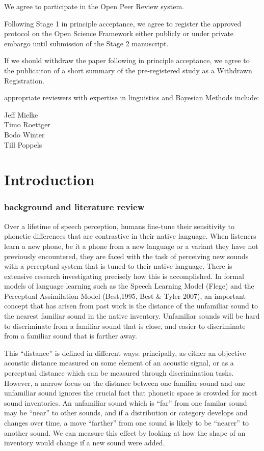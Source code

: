 \documentclass[]{article}
\begin{document}
We agree to participate in the Open Peer Review system.

Following Stage 1 in principle acceptance, we agree to register the
approved protocol on the Open Science Framework either publicly or under
private embargo until submission of the Stage 2 manuscript.

If we should withdraw the paper following in principle acceptance, we
agree to the publicaiton of a short summary of the pre-registered study
as a Withdrawn Registration.

appropriate reviewers with expertise in linguistics and Bayesian Methods
include:

Jeff Mielke\\
Timo Roettger\\
Bodo Winter\\
Till Poppels

\hypertarget{introduction}{%
\section{Introduction}\label{introduction}}

\hypertarget{background-and-literature-review}{%
\subsubsection{background and literature
review}\label{background-and-literature-review}}

Over a lifetime of speech perception, humans fine-tune their sensitivity
to phonetic differences that are contrastive in their native language.
When listeners learn a new phone, be it a phone from a new language or a
variant they have not previously encountered, they are faced with the
task of perceiving new sounds with a perceptual system that is tuned to
their native language. There is extensive research investigating
precisely how this is accomplished. In formal models of language
learning such as the Speech Learning Model (Flege) and the Perceptual
Assimilation Model (Best,1995, Best \& Tyler 2007), an important concept
that has arisen from past work is the distance of the unfamiliar sound
to the nearest familiar sound in the native inventory. Unfamiliar sounds
will be hard to discriminate from a familiar sound that is close, and
easier to discriminate from a familiar sound that is farther away.

This ``distance'' is defined in different ways: principally, as either
an objective acoustic distance measured on some element of an acoustic
signal, or as a perceptual distance which can be measured through
discrimination tasks. However, a narrow focus on the distance between
one familiar sound and one unfamiliar sound ignores the crucial fact
that phonetic space is crowded for most sound inventories. An unfamiliar
sound which is ``far'' from one familar sound may be ``near'' to other
sounds, and if a distribution or category develops and changes over
time, a move ``farther'' from one sound is likely to be ``nearer'' to
another sound. We can measure this effect by looking at how the shape of
an inventory would change if a new sound were added.
\end{document}
